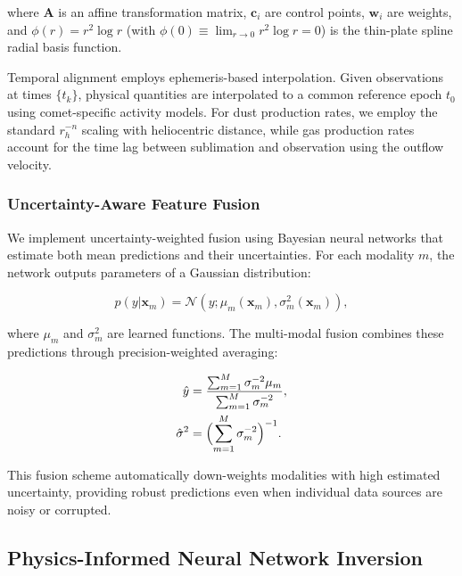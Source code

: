 \documentclass[preprint2]{aastex631}
\begin{document}
where $\mathbf{A}$ is an affine transformation matrix, $\mathbf{c}_i$ are control points, $\mathbf{w}_i$ are weights, and $\phi(r) = r^2 \log r$ (with $\phi(0) \equiv \lim_{r\to 0} r^2\log r = 0$) is the thin-plate spline radial basis function.

Temporal alignment employs ephemeris-based interpolation. Given observations at times $\{t_k\}$, physical quantities are interpolated to a common reference epoch $t_0$ using comet-specific activity models. For dust production rates, we employ the standard $r_h^{-n}$ scaling with heliocentric distance, while gas production rates account for the time lag between sublimation and observation using the outflow velocity.

\subsubsection{Uncertainty-Aware Feature Fusion}

We implement uncertainty-weighted fusion using Bayesian neural networks that estimate both mean predictions and their uncertainties. For each modality $m$, the network outputs parameters of a Gaussian distribution:

\begin{equation}\label{eq:prob_output}
p(y | \mathbf{x}_m) = \mathcal{N}(y; \mu_m(\mathbf{x}_m), \sigma_m^2(\mathbf{x}_m)),
\end{equation}

where $\mu_m$ and $\sigma_m^2$ are learned functions. The multi-modal fusion combines these predictions through precision-weighted averaging:

\begin{equation}\label{eq:uncertainty_fusion}
\begin{split}
\hat{y} &= \frac{\sum_{m=1}^{M} \sigma_m^{-2} \mu_m}{\sum_{m=1}^{M} \sigma_m^{-2}}, \\
\hat{\sigma}^2 &= \Bigl(\sum_{m=1}^{M} \sigma_m^{-2}\Bigr)^{-1}.
\end{split}
\end{equation}

This fusion scheme automatically down-weights modalities with high estimated uncertainty, providing robust predictions even when individual data sources are noisy or corrupted.

\subsection{Physics-Informed Neural Network Inversion}
\end{document}

